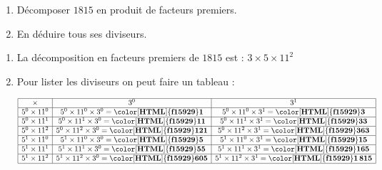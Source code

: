 \begin{exercice*}
    \begin{enumerate}
        \item Décomposer $\num{1815}$ en produit de facteurs premiers.
        \item En déduire tous ses diviseurs.
    \end{enumerate}
\end{exercice*}
\begin{corrige}

    \begin{enumerate}
        \item La décomposition en facteurs premiers de $\num{1815}$ est : $3\times 5\times 11^{2}$ 
        \item Pour lister les diviseurs on peut faire un tableau :
        
        \smallskip
        $
        \begin{array}{|c|c|c|}
        \hline
        \times & 3^{0} & 3^{1}\\
        \hline
        5^{0}\times11^{0} & 5^{0}\times11^{0}\times3^{0}=\mathbf{{\color[HTML]{f15929}1}} & 5^{0}\times11^{0}\times3^{1}=\mathbf{{\color[HTML]{f15929}3}}\\
        \hline
        5^{0}\times11^{1} & 5^{0}\times11^{1}\times3^{0}=\mathbf{{\color[HTML]{f15929}11}} & 5^{0}\times11^{1}\times3^{1}=\mathbf{{\color[HTML]{f15929}33}}\\
        \hline
        5^{0}\times11^{2} & 5^{0}\times11^{2}\times3^{0}=\mathbf{{\color[HTML]{f15929}121}} & 5^{0}\times11^{2}\times3^{1}=\mathbf{{\color[HTML]{f15929}363}}\\
        \hline
        5^{1}\times11^{0} & 5^{1}\times11^{0}\times3^{0}=\mathbf{{\color[HTML]{f15929}5}} & 5^{1}\times11^{0}\times3^{1}=\mathbf{{\color[HTML]{f15929}15}}\\
        \hline
        5^{1}\times11^{1} & 5^{1}\times11^{1}\times3^{0}=\mathbf{{\color[HTML]{f15929}55}} & 5^{1}\times11^{1}\times3^{1}=\mathbf{{\color[HTML]{f15929}165}}\\
        \hline
        5^{1}\times11^{2} & 5^{1}\times11^{2}\times3^{0}=\mathbf{{\color[HTML]{f15929}605}} & 5^{1}\times11^{2}\times3^{1}=\mathbf{{\color[HTML]{f15929}1\,815}}\\
        \hline
        \end{array}
        $
        \smallskip


\end{enumerate}
\end{corrige}
